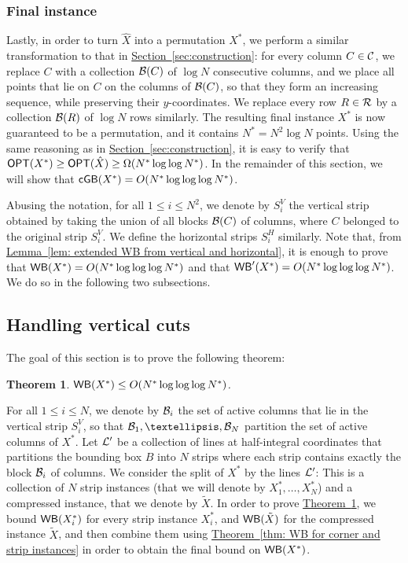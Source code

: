 \documentclass[11pt]{article}
\numberwithin{equation}{section}
\newtheorem{theorem}{Theorem}[section]
\theoremstyle{definition}
\theoremstyle{plain}
\newcommand{\expref}[2]{\hyperref[#2]{#1~\ref{#2}}}
\begin{document}
\subsubsection{Final instance}


Lastly, in order to turn $\hat X$ into a permutation $X^*$, we perform a similar transformation to that in \expref{Section}{sec:construction}: for every column $C\in {\mathcal C}$, we replace $C$ with a collection ${\mathcal{B}}(C)$ of $\log N$ consecutive columns, and we place all points that lie on $C$ on the columns of ${\mathcal{B}}(C)$, so that they form an increasing sequence, while preserving their $y$-coordinates. We replace every row $R\in {\mathcal R}$ by a collection ${\mathcal{B}}(R)$ of $\log N$ rows similarly. The resulting final instance $X^*$ is now guaranteed to be a permutation, and it contains $N^*=N^2\log N$ points. Using the same reasoning as in \expref{Section}{sec:construction}, it is easy to verify that $\mbox{\sf OPT}(X^*)\geq \mbox{\sf OPT}(\hat X)\geq \Omega(N^*\log\log N^*)$. In the remainder of this section, we will show that $\mathsf{cGB}(X^*)=O(N^*\log\log \log N^*)$. 

Abusing the notation, for all $1\leq i\leq N^2$, we denote by $S^V_i$ the vertical strip obtained by taking the union of all blocks ${\mathcal{B}}(C)$ of columns, where $C$ belonged to the original strip $S^V_i$. We define the horizontal strips $S^H_i$ similarly. Note that, from \expref{Lemma}{lem: extended WB from vertical and horizontal}, it is enough to prove that $\mathsf{WB}(X^*)=O(N^*\log\log \log N^*)$ and that  $\mathsf{WB}'(X^*)=O(N^*\log\log \log N^*)$. We do so in the following two subsections.


%
%
%
%
\subsection{Handling vertical cuts}\label{subsec: bounding WB vertical}
%
%
%
%
The goal of this section is to prove the following theorem:

\begin{theorem}\label{thm: boundinb WB vertical}
	$\mathsf{WB}(X^*)\leq O(N^*\log\log\log N^*)$.
\end{theorem}

For all $1\leq i\leq N$, we denote by ${\mathcal{B}}_i$ the set of active columns that lie in the vertical strip $S^V_i$, so that $\bset_1,\ldots,\bset_N$ partition the set of active columns of $X^*$.
Let ${\mathcal L}'$ be a collection of lines at half-integral coordinates that partitions the bounding box $B$ into $N$ strips where each strip contains exactly the block ${\mathcal{B}}_i$ of columns. 
We consider the split of $X^*$ by the lines ${\mathcal L}'$: This is a collection of $N$ strip instances (that we will denote by $X^*_1,\ldots,X^*_N$) and a compressed instance, that we denote by $\tilde X$.     
%
%
In order to prove \expref{Theorem}{thm: boundinb WB vertical}, we bound $\mathsf{WB}(X^*_i)$ for every strip instance $X^*_i$, and $\mathsf{WB}(\tilde X)$ for the compressed instance $\tilde X$, and then combine them using \expref{Theorem}{thm: WB for corner and strip instances} in order to obtain the final bound on $\mathsf{WB}(X^*)$.
\end{document}
